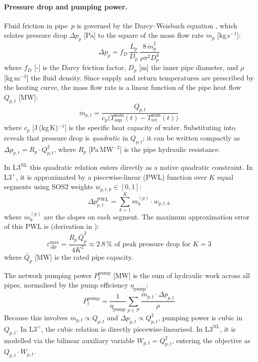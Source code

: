 \documentclass[a4paper,fleqn]{cas-dc}
\newcommand{\Lplus}{\mathrm{L3}^{+}}
\newcommand{\Lnl}{\mathrm{L3}^{\mathrm{NL}}}
\begin{document}
\paragraph{Pressure drop and pumping power.}
\label{sec:model_pressure}
Fluid friction in pipe~$p$ is governed by the Darcy--Weisbach
equation \cite{vanderHeijde2017}, which relates pressure drop $\Delta p_p$ [Pa] to the
square of the mass flow rate $\dot{m}_p$ [kg\,s$^{-1}$]:
%
\begin{equation}
  \Delta p_{p} = f_D\, \frac{L_p}{D_p}\,
    \frac{8\,\dot{m}_p^2}{\rho \pi^2 D_p^4}
  \label{eq:darcy}
\end{equation}
%
where $f_D$ [-] is the Darcy friction factor, $D_p$ [m] the inner
pipe diameter, and $\rho$ [kg\,m$^{-3}$] the fluid density.
Since supply and return temperatures are prescribed by the heating
curve, the mass flow rate is a linear function of the pipe heat
flow $Q_{p,t}$ [MW]:
%
\begin{equation}
  \dot{m}_{p,t} = \frac{Q_{p,t}}{
    c_p \bigl(T_{\mathrm{sup}}^{\mathrm{nom}}(t)
    - T_{\mathrm{ret}}^{\mathrm{nom}}(t)\bigr)}
  \label{eq:massflow}
\end{equation}
%
where $c_p$ [J\,(kg\,K)$^{-1}$] is the specific heat capacity of
water. Substituting  into  reveals
that pressure drop is \emph{quadratic} in $Q_{p,t}$; it can be
written compactly as $\Delta p_{p,t} = R_p \cdot Q_{p,t}^2$, where
$R_p$ [Pa\,MW$^{-2}$] is the pipe hydraulic resistance.

In $\Lnl$ this quadratic relation enters directly as a native
quadratic constraint. In $\Lplus$, it is approximated by a
piecewise-linear (PWL) function over $K$ equal segments using SOS2
weights $w_{p,t,k} \in [0,1]$:
%
\begin{equation}
  \Delta p_{p,t}^{\mathrm{PWL}} = \sum_{k=1}^{K}
    m_k^{(p)} \cdot w_{p,t,k}
  \label{eq:pressure_pwl}
\end{equation}
%
where $m_k^{(p)}$ are the slopes on each segment. The maximum
approximation error of this PWL is (derivation in ):
%
\begin{equation*}
  \varepsilon_{\Delta p}^{\max}
    = \frac{R_p\, \bar{Q}_p^2}{4K^2}
    \approx 2.8\,\% \text{ of peak pressure drop for } K{=}3
\end{equation*}
%
where $\bar{Q}_p$ [MW] is the rated pipe capacity.

The network pumping power $P_t^{\mathrm{pump}}$ [MW] is the sum
of hydraulic work across all pipes, normalised by the pump
efficiency $\eta_{\mathrm{pump}}$:
%
\begin{equation}
  P_t^{\mathrm{pump}} = \frac{1}{\eta_{\mathrm{pump}}}
    \sum_{p \in \mathcal{P}}
    \frac{\dot{m}_{p,t} \cdot \Delta p_{p,t}}{\rho}
  \label{eq:pump_power}
\end{equation}
%
Because this involves $\dot{m}_{p,t} \propto Q_{p,t}$ and
$\Delta p_{p,t} \propto Q_{p,t}^2$, pumping power is cubic in
$Q_{p,t}$. In $\Lplus$, the cubic relation is directly
piecewise-linearised. In $\Lnl$, it is modelled via the bilinear
auxiliary variable $W_{p,t} = Q_{p,t}^2$, entering the objective
as $Q_{p,t} \cdot W_{p,t}$.
\end{document}
